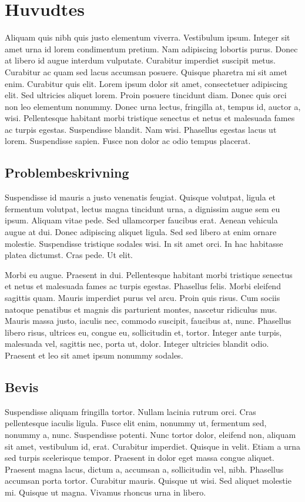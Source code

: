 \documentclass[a4paper,11pt]{kth-mag}
\begin{document}
\section{Huvudtes}

Aliquam quis nibh quis justo elementum viverra. Vestibulum ipsum.
Integer sit amet urna id lorem condimentum pretium. Nam adipiscing
lobortis purus. Donec at libero id augue interdum vulputate. Curabitur
imperdiet suscipit metus. Curabitur ac quam sed lacus accumsan
posuere. Quisque pharetra mi sit amet enim. Curabitur quis elit. Lorem
ipsum dolor sit amet, consectetuer adipiscing elit. Sed ultricies
aliquet lorem. Proin posuere tincidunt diam. Donec quis orci non leo
elementum nonummy. Donec urna lectus, fringilla at, tempus id, auctor
a, wisi. Pellentesque habitant morbi tristique senectus et netus et
malesuada fames ac turpis egestas. Suspendisse blandit. Nam wisi.
Phasellus egestas lacus ut lorem. Suspendisse sapien. Fusce non dolor
ac odio tempus placerat.

\subsection{Problembeskrivning}

Suspendisse id mauris a justo venenatis feugiat. Quisque volutpat,
ligula et fermentum volutpat, lectus magna tincidunt urna, a dignissim
augue sem eu ipsum. Aliquam vitae pede. Sed ullamcorper faucibus erat.
Aenean vehicula augue at dui. Donec adipiscing aliquet ligula. Sed sed
libero at enim ornare molestie. Suspendisse tristique sodales wisi. In
sit amet orci. In hac habitasse platea dictumst. Cras pede. Ut elit.

Morbi eu augue. Praesent in dui. Pellentesque habitant morbi tristique
senectus et netus et malesuada fames ac turpis egestas. Phasellus
felis. Morbi eleifend sagittis quam. Mauris imperdiet purus vel arcu.
Proin quis risus. Cum sociis natoque penatibus et magnis dis
parturient montes, nascetur ridiculus mus. Mauris massa justo, iaculis
nec, commodo suscipit, faucibus at, nunc. Phasellus libero risus,
ultrices eu, congue eu, sollicitudin et, tortor. Integer ante turpis,
malesuada vel, sagittis nec, porta ut, dolor. Integer ultricies
blandit odio. Praesent et leo sit amet ipsum nonummy sodales.

\subsection{Bevis}

Suspendisse aliquam fringilla tortor. Nullam lacinia rutrum orci. Cras
pellentesque iaculis ligula. Fusce elit enim, nonummy ut, fermentum
sed, nonummy a, nunc. Suspendisse potenti. Nunc tortor dolor, eleifend
non, aliquam sit amet, vestibulum id, erat. Curabitur imperdiet.
Quisque in velit. Etiam a urna sed turpis scelerisque tempor. Praesent
in dolor eget massa congue aliquet. Praesent magna lacus, dictum a,
accumsan a, sollicitudin vel, nibh. Phasellus accumsan porta tortor.
Curabitur mauris. Quisque ut wisi. Sed aliquet molestie mi. Quisque ut
magna. Vivamus rhoncus urna in libero.
\end{document}
